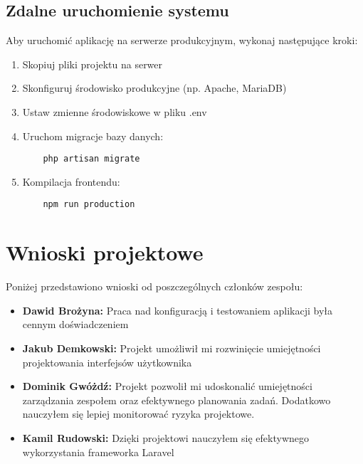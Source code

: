 \documentclass[a4paper,12pt]{article}
\begin{document}
\subsection{Zdalne uruchomienie systemu}
Aby uruchomić aplikację na serwerze produkcyjnym, wykonaj następujące kroki:
\begin{enumerate}
    \item Skopiuj pliki projektu na serwer
    \item Skonfiguruj środowisko produkcyjne (np. Apache, MariaDB)
    \item Ustaw zmienne środowiskowe w pliku .env
    \item Uruchom migracje bazy danych:
    \begin{verbatim}
    php artisan migrate
    \end{verbatim}
    \item Kompilacja frontendu:
    \begin{verbatim}
    npm run production
    \end{verbatim}
\end{enumerate}

\section{Wnioski projektowe}
Poniżej przedstawiono wnioski od poszczególnych członków zespołu:
\begin{itemize}
    \item \textbf{Dawid Brożyna:}  Praca nad konfiguracją i testowaniem aplikacji była cennym doświadczeniem
    \item \textbf{Jakub Demkowski:} Projekt umożliwił mi rozwinięcie umiejętności projektowania interfejsów użytkownika
    \item \textbf{Dominik Gwóżdź:} Projekt pozwolił mi udoskonalić umiejętności zarządzania zespołem oraz efektywnego planowania zadań. Dodatkowo nauczyłem się lepiej monitorować ryzyka projektowe.
    \item \textbf{Kamil Rudowski:} Dzięki projektowi nauczyłem się efektywnego wykorzystania frameworka Laravel
\end{itemize}
\end{document}
